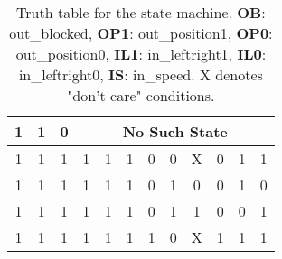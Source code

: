 \begin{table}[H]
\begin{tabular}{|c|c|c|c|c|c|c|c|c|c|c|c|}
        1 & 1 & 0 & \multicolumn{9}{c|}{No Such State} \\ \hline
        1 & 1 & 1 & 1 & 1 & 1 & 0 & 0 & X & 0 & 1 & 1 \\ \hline
        1 & 1 & 1 & 1 & 1 & 1 & 0 & 1 & 0 & 0 & 1 & 0 \\ \hline
        1 & 1 & 1 & 1 & 1 & 1 & 0 & 1 & 1 & 0 & 0 & 1 \\ \hline
        1 & 1 & 1 & 1 & 1 & 1 & 1 & 0 & X & 1 & 1 & 1 \\ \hline
    \end{tabular}
    \caption{Truth table for the state machine. \textbf{OB}: out\_blocked, \textbf{OP1}: out\_position1, \textbf{OP0}: out\_position0, \textbf{IL1}: in\_leftright1, \textbf{IL0}: in\_leftright0, \textbf{IS}: in\_speed. X denotes "don't care" conditions.}
    \label{tab:truth_table}
\end{table}

